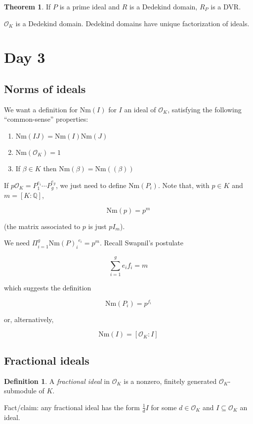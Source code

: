 \documentclass{article}
\newcommand{\Q}{\mathbb Q}
\newcommand{\ok}{\mathcal O_K}
\newcommand{\Nm}[1]{\text{Nm}(#1)}
\theoremstyle{definition}
\newtheorem*{thm}{Theorem}
\newtheorem*{defn}{Definition}
\begin{document}
\begin{thm}
  If $P$ is a prime ideal and $R$ is a Dedekind domain, $R_P$ is a DVR.
\end{thm}

$\ok$ is a Dedekind domain.
Dedekind domains have unique factorization of ideals.

\section{Day 3}
\subsection{Norms of ideals}

We want a definition for $\Nm I$ for $I$ an ideal of $\ok$, satisfying the
following ``common-sense'' properties:

\begin{enumerate}
\item $\Nm {IJ} = \Nm I \Nm J$
\item $\Nm \ok = 1$
\item If $\beta\in K$ then $\Nm \beta = \Nm{(\beta)}$
\end{enumerate}

If $p\ok = P_1^{e_i}\cdots P_g^{e_g}$, we just need to define $\Nm {P_i}$. Note
that, with $p\in K$ and $m=[K:\Q]$,

$$\Nm p = p^m$$

(the matrix associated to $p$ is just $pI_m$).

We need $\Pi^g_{i=1} {\Nm P_i}^{e_i} = p^m$. Recall Swapnil's postulate

$$\sum_{i=1}^g e_if_i = m$$

which suggests the definition

$$\Nm {P_i} = p^{f_i}$$

or, alternatively,

$$\Nm I = [\ok:I]$$

\subsection{Fractional ideals}
\begin{defn}
 A \textit{fractional ideal} in $\ok$ is a nonzero, finitely generated
 $\ok$-submodule of $K$.
\end{defn}

Fact/claim: any fractional ideal has the form $\frac1d I$ for some $d\in\ok$ and
$I\subseteq\ok$ an ideal.
\end{document}
